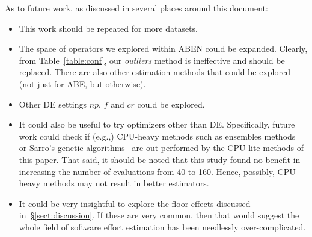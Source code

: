 \documentclass[10pt,conference]{IEEEtran}
\newcommand{\bi}{\begin{itemize}}
\newcommand{\ei}{\end{itemize}}
\newcommand{\tion}[1]{\S\ref{sect:#1}}
\begin{document}
As to future work, as  discussed in several places around this document:
\bi
\item This work should be repeated for  more     datasets. 
\item The space of operators we explored within ABEN could be expanded. Clearly, from Table~\ref{table:conf}, our {\em outliers} method is ineffective and
should be replaced. There are also other  estimation methods that could be explored (not just  for ABE, but otherwise).
\item
Other DE settings  $\mathit{np}$, $\mathit{f}$ and $\mathit{cr}$ could be explored.
\item
It could also be useful to try optimizers other than DE.
Specifically, future work could check  if (e.g.,) CPU-heavy methods such as ensembles methods~\cite{Kocaguneli:2012} or Sarro's genetic algorithms~\cite{sarro2016multi} 
are out-performed by the CPU-lite methods of this paper. That said, it should be noted that this study found no benefit in increasing the number of evaluations from  40 to 160.  Hence, possibly,  CPU-heavy
methods may not result in better estimators.
\item
It could be very insightful to explore the floor effects discussed in~\tion{discussion}. If these are very common, then that would
suggest the whole field of software effort estimation has been needlessly over-complicated.
\ei


 
%
%

  
\tiny


 
%
\end{document}
